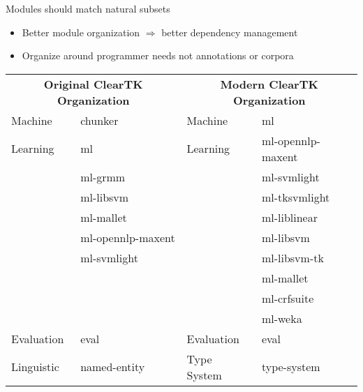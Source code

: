 \documentclass[final]{beamer}
\begin{document}
\begin{frame}[fragile]
\begin{columns}[t]
\begin{column}{.45\linewidth}
    \begin{block}{Modules should match natural subsets}
            \begin{itemize}
                    \item Better module organization $\Rightarrow$ better dependency management
                    \item Organize around programmer needs not annotations or corpora
            \end{itemize}
            \bigskip
            \begin{center}\small
                    \begin{tabular*}{.90\linewidth}{ll|ll}
                    \cline{1-4}
                    \cline{1-4}
                    \multicolumn{2}{c|}{\textbf{Original ClearTK Organization}}  & \multicolumn{2}{c}{\textbf{Modern ClearTK Organization}}\\
                    \cline{1-4}
                    \cline{1-4}
                    Machine          & chunker          & Machine          & ml\\
                    Learning         & ml               & Learning         & ml-opennlp-maxent \\
                                     & ml-grmm          &                  & ml-svmlight \\
                                     & ml-libsvm        &                  & ml-tksvmlight \\
                                     & ml-mallet        &                  & ml-liblinear \\ 
                                     & ml-opennlp-maxent &                 & ml-libsvm \\
                                     & ml-svmlight       &                 & ml-libsvm-tk\\
                                     &                           &                 & ml-mallet \\
                                     &                           &                 & ml-crfsuite \\
                                     &                           &                 & ml-weka \\
                    \cline{1-4}
                    Evaluation       & eval              & Evaluation      & eval \\
                    \cline{1-4}
                    Linguistic       & named-entity  & Type System & type-system \\

\end{tabular*}
\end{center}
\end{block}
\end{column}
\end{columns}
\end{frame}
\end{document}
